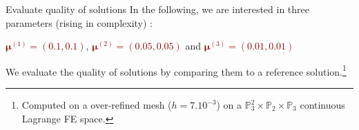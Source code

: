 \begin{frame}{Evaluate quality of solutions}
	In the following, we are interested in three parameters (rising in complexity) :

	\begin{center}
		\textcolor<2>{darkred}{$\bm{\mu}^{(1)} = (0.1,0.1)$}, \textcolor<3>{darkred}{$\bm{\mu}^{(2)} = (0.05,0.05)$} and \textcolor<4>{darkred}{$\bm{\mu}^{(3)} = (0.01,0.01)$}
	\end{center}

	We evaluate the quality of solutions by comparing them to a reference solution.\footnote[frame,1]{Computed on a over-refined mesh ($h=7.10^{-3}$) on a $\mathbb{P}_3^2\times \mathbb{P}_2 \times \mathbb{P}_3$ continuous Lagrange FE space.}

	\vspace{10pt}

	 \only<4>{$Ra = 156\,960$}

	\vspace{3pt}
	\vspace{-3pt}

	\begin{center}
	\end{center}

\end{frame}